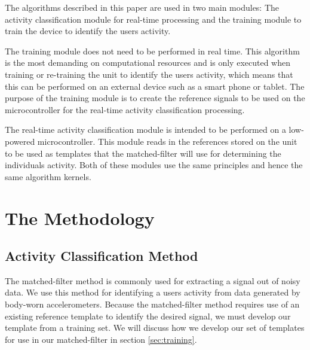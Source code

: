 \documentclass[conference]{IEEEtran}
\begin{document}
The algorithms described in this paper are used in two main modules: The activity classification module for real-time processing and the training module to train the device to identify the user\textquotesingle s activity.

The training module does not need to be performed in real time.
This algorithm is the most demanding on computational resources and is only executed when training or re-training the unit to identify the user\textquotesingle s activity, which means that this can be performed on an external device such as a smart phone or tablet.
The purpose of the training module is to create the reference signals to be used on the microcontroller for the real-time activity classification processing.

The real-time activity classification module is intended to be performed on a low-powered microcontroller.
This module reads in the references stored on the unit to be used as templates that the matched-filter will use for determining the individual\textquotesingle s activity.
Both of these modules use the same principles and hence the same algorithm kernels.
%
\section{The Methodology}
%
\subsection{Activity Classification Method}
The matched-filter method is commonly used for extracting a signal out of noisy data.
We use this method for identifying a user\textquotesingle s activity from data generated by body-worn accelerometers.
Because the matched-filter method requires use of an existing reference template to identify the desired signal, we must develop our template from a training set.
We will discuss how we develop our set of templates for use in our matched-filter in section \ref{sec:training}.
\end{document}
